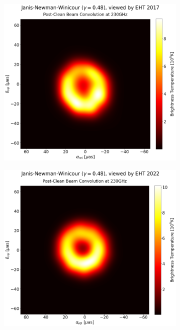 \begin{figure}[h!]
	\centering
	\begin{subfigure}{6cm}
		\hspace{-1.5cm}
		\includegraphics[scale = 0.20]{Ehtim_plot_2017_JNW.png}
	\end{subfigure}
	\begin{subfigure}{6cm}
		\hspace{-0.0cm}
		\includegraphics[scale = 0.20]{Ehtim_plot_2022_JNW.png}

\end{subfigure}
\end{figure}
